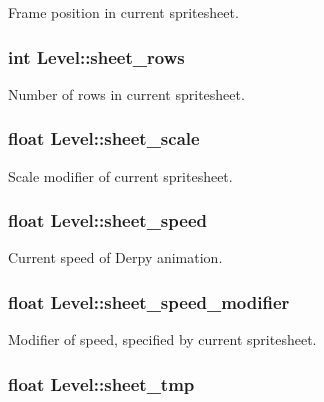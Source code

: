 \-Frame position in current spritesheet. \hypertarget{structLevel_a6d608b79c9b4dd8a5efc0c7e5fb482b0}{
\subsubsection[{sheet\-\_\-rows}]{\setlength{\rightskip}{0pt plus 5cm}int {\bf \-Level\-::sheet\-\_\-rows}}}\label{structLevel_a6d608b79c9b4dd8a5efc0c7e5fb482b0}
\-Number of rows in current spritesheet. \hypertarget{structLevel_a267a140bd3de1fc3f23a88623de425ed}{
\subsubsection[{sheet\-\_\-scale}]{\setlength{\rightskip}{0pt plus 5cm}float {\bf \-Level\-::sheet\-\_\-scale}}}\label{structLevel_a267a140bd3de1fc3f23a88623de425ed}
\-Scale modifier of current spritesheet. \hypertarget{structLevel_a41db1345ac158898450907010a49748f}{
\subsubsection[{sheet\-\_\-speed}]{\setlength{\rightskip}{0pt plus 5cm}float {\bf \-Level\-::sheet\-\_\-speed}}}\label{structLevel_a41db1345ac158898450907010a49748f}
\-Current speed of \-Derpy animation. \hypertarget{structLevel_a3cae10fd441bcc14b6a47dd5fedafa59}{
\subsubsection[{sheet\-\_\-speed\-\_\-modifier}]{\setlength{\rightskip}{0pt plus 5cm}float {\bf \-Level\-::sheet\-\_\-speed\-\_\-modifier}}}\label{structLevel_a3cae10fd441bcc14b6a47dd5fedafa59}
\-Modifier of speed, specified by current spritesheet. \hypertarget{structLevel_a22e80ea91fd267dae85c0457e581d072}{
\subsubsection[{sheet\-\_\-tmp}]{\setlength{\rightskip}{0pt plus 5cm}float {\bf \-Level\-::sheet\-\_\-tmp}}}\label{structLevel_a22e80ea91fd267dae85c0457e581d072}
